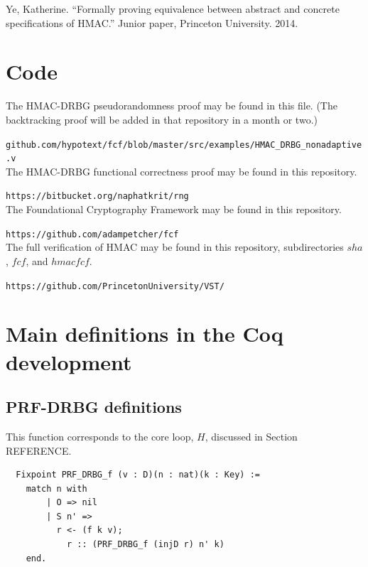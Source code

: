 \documentclass[12pt,lot, lof]{puthesis}
\newcommand{\li} {\lstinline}
\begin{document}
{\begin{thebibliography}{99}
Ye, Katherine. ``Formally proving equivalence between abstract and concrete specifications of HMAC.'' Junior paper, Princeton University. 2014.

\end{thebibliography}

 \appendix

\chapter{Code}

The HMAC-DRBG pseudorandomness proof may be found in this file. (The backtracking proof will be added in that repository in a month or two.) 

\li|github.com/hypotext/fcf/blob/master/src/examples/HMAC_DRBG_nonadaptive.v| \\

\noindent The HMAC-DRBG functional correctness proof may be found in this repository. 

\li|https://bitbucket.org/naphatkrit/rng| \\

\noindent The Foundational Cryptography Framework may be found in this repository. 

\li|https://github.com/adampetcher/fcf| \\

\noindent The full verification of HMAC may be found in this repository, subdirectories $sha$, $fcf$, and $hmacfcf$. 

\li|https://github.com/PrincetonUniversity/VST/|

\chapter{Main definitions in the Coq development}

\section{PRF-DRBG definitions}

This function corresponds to the core loop, $H$, discussed in Section REFERENCE.

\begin{lstlisting}
  Fixpoint PRF_DRBG_f (v : D)(n : nat)(k : Key) :=
    match n with
        | O => nil
        | S n' => 
          r <- (f k v);
            r :: (PRF_DRBG_f (injD r) n' k)
    end.
\end{lstlisting}

}
\end{document}

